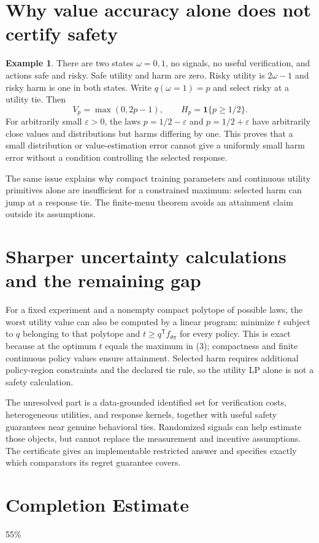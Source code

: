 \documentclass[11pt]{article}
\theoremstyle{definition}
\newtheorem{example}[theorem]{Example}
\begin{document}
\section*{Why value accuracy alone does not certify safety}
\begin{example}
There are two states $\omega=0,1$, no signals, no useful verification,
and actions safe and risky. Safe utility and harm are zero. Risky utility
is $2\omega-1$ and risky harm is one in both states. Write
$q(\omega=1)=p$ and select risky at a utility tie. Then
\[
 V_p=\max(0,2p-1),\qquad H_p=\mathbf1\{p\ge1/2\}.
\]
For arbitrarily small $\varepsilon>0$, the laws $p=1/2-\varepsilon$
and $p=1/2+\varepsilon$ have arbitrarily close values and distributions
but harms differing by one. This proves that a small distribution or
value-estimation error cannot give a uniformly small harm error without
a condition controlling the selected response.
\end{example}
The same issue explains why compact training parameters and continuous
utility primitives alone are insufficient for a constrained maximum:
selected harm can jump at a response tie. The finite-menu theorem avoids
an attainment claim outside its assumptions.

\section*{Sharper uncertainty calculations and the remaining gap}
For a fixed experiment and a nonempty compact polytope of possible laws,
the worst utility value can also be computed by a linear program:
minimize $t$ subject to $q$ belonging to that polytope and
$t\ge q^{\mathsf T}f_{\theta\pi}$ for every policy. This is exact
because at the optimum $t$ equals the maximum in (3); compactness and
finite continuous policy values ensure attainment. Selected harm requires
additional policy-region constraints and the declared tie rule, so the
utility LP alone is not a safety calculation.

The unresolved part is a data-grounded identified set for verification
costs, heterogeneous utilities, and response kernels, together with useful
safety guarantees near genuine behavioral ties. Randomized signals can
help estimate those objects, but cannot replace the measurement and
incentive assumptions. The certificate gives an implementable restricted
answer and specifies exactly which comparators its regret guarantee covers.

\section{Completion Estimate}
55\%
\end{document}
